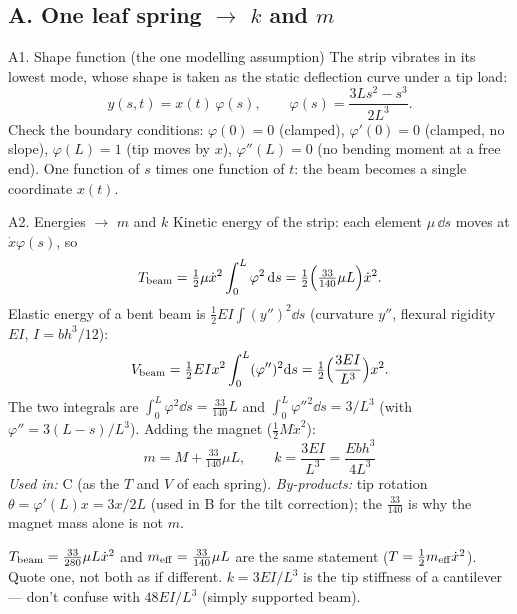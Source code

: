 \documentclass[11pt,a4paper]{article}
\begin{document}
\subsection*{A. One leaf spring $\to$ $k$ and $m$}
\begin{stepbox}{A1. Shape function (the one modelling assumption)}
The strip vibrates in its lowest mode, whose shape is taken as the static deflection curve under a tip load:
\[ y(s,t)=x(t)\,\varphi(s),\qquad \varphi(s)=\frac{3Ls^2-s^3}{2L^3}. \]
Check the boundary conditions: $\varphi(0)=0$ (clamped), $\varphi'(0)=0$ (clamped, no slope), $\varphi(L)=1$ (tip moves by $x$), $\varphi''(L)=0$ (no bending moment at a free end). One function of $s$ times one function of $t$: the beam becomes a single coordinate $x(t)$.
\end{stepbox}
\begin{stepbox}{A2. Energies $\to$ $m$ and $k$}
Kinetic energy of the strip: each element $\mu\,\dd s$ moves at $\dot x\varphi(s)$, so
\[ T_{\rm beam}=\tfrac12\mu\dot x^2\int_0^L\varphi^2\,\mathrm{d} s=\tfrac12\Bigl(\tfrac{33}{140}\mu L\Bigr)\dot x^2. \]
Elastic energy of a bent beam is $\tfrac12EI\int(y'')^2\dd s$ (curvature $y''$, flexural rigidity $EI$, $I=bh^3/12$):
\[ V_{\rm beam}=\tfrac12EIx^2\int_0^L(\varphi'')^2\mathrm{d} s=\tfrac12\Bigl(\frac{3EI}{L^3}\Bigr)x^2 . \]
The two integrals are $\int_0^L\varphi^2\dd s=\frac{33}{140}L$ and $\int_0^L\varphi''^2\dd s=3/L^3$ (with $\varphi''=3(L-s)/L^3$). Adding the magnet ($\tfrac12M\dot x^2$):
\[ \boxed{m=M+\tfrac{33}{140}\mu L,\qquad k=\frac{3EI}{L^3}=\frac{Ebh^3}{4L^3}} \]
\textit{Used in:} C (as the $T$ and $V$ of each spring). \textit{By-products:} tip rotation $\theta=\varphi'(L)x=3x/2L$ (used in B for the tilt correction); the $\tfrac{33}{140}$ is why the magnet mass alone is not $m$.
\end{stepbox}
\begin{warnbox}
$T_{\rm beam}=\tfrac{33}{280}\mu L\dot x^2$ and $m_{\rm eff}=\tfrac{33}{140}\mu L$ are the same statement ($T=\tfrac12 m_{\rm eff}\dot x^2$). Quote one, not both as if different. $k=3EI/L^3$ is the tip stiffness of a cantilever --- don't confuse with $48EI/L^3$ (simply supported beam).
\end{warnbox}
\end{document}
